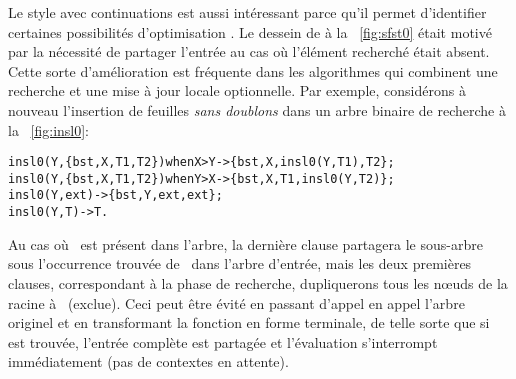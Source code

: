  Le style
avec continuations est aussi intéressant parce qu'il permet
d'identifier certaines possibilités d'optimisation
\citep{Danvy_2004}. Le dessein de  à la
\fig~\vref{fig:sfst0} était motivé par la nécessité de partager
l'entrée au cas où l'élément recherché était absent. Cette sorte
d'amélioration est fréquente dans les algorithmes qui combinent une
recherche et une mise à jour locale optionnelle. Par exemple,
considérons à nouveau l'insertion de feuilles \emph{sans doublons}
dans un arbre binaire de recherche à
la \fig~\vref{fig:insl0}:
\begin{alltt}
insl0(Y,\{bst,X,T1,T2\}) when X > Y -> \{bst,X,insl0(Y,T1),T2\};
insl0(Y,\{bst,X,T1,T2\}) when Y > X -> \{bst,X,T1,insl0(Y,T2)\};
insl0(Y,          ext)            -> \{bst,Y,ext,ext\};
insl0(Y,            T)            -> T.
\end{alltt}
Au cas où ~est présent dans l'arbre, la dernière clause
partagera le sous-arbre sous l'occurrence trouvée de~ dans
l'arbre d'entrée, mais les deux premières clauses, correspondant à la
phase de recherche, dupliquerons tous les n{\oe}uds de la racine
à~ (exclue). Ceci peut être évité en passant d'appel en
appel l'arbre originel et en transformant la fonction en forme
terminale, de telle sorte que si~ est trouvée, l'entrée
complète est partagée et l'évaluation s'interrompt immédiatement (pas
de contextes en attente).

